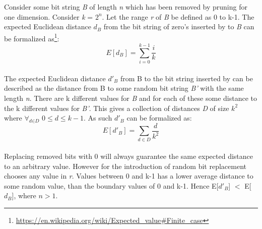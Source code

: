 Consider some bit string \textit{B} of length \textit{n} which has been removed by \qs{} pruning for one dimension. Consider \textit{k} = $2^n$. Let the range \textit{r} of \textit{B} be defined as 0 to k-1. The expected Euclidean distance \textit{$d_B$} from the bit string of zero's inserted by \qs{} to \textit{B} can be formalized as\footnote{\url{https://en.wikipedia.org/wiki/Expected_value\#Finite_case}}:
\\
$$E[\textit{$d_B$}] = \sum_{i=0}^{k - 1} \dfrac{i}{k}$$
\\
The expected Euclidean distance \textit{$d'_B$} from B to the bit string inserted by \qsr{} can be described as the distance from B to some random bit string \textit{B'} with the same length \textit{n}. There are k different values for \textit{B} and for each of these some distance to the k different values for \textit{B'}. This gives a collection of distances \textit{D} of size $k^2$ where $\forall{}_{\textit{d}\in{}\textit{D}}$ $0\leq{}d\leq{}k-1$. As such \textit{$d'_B$} can be formalized as:
\\
$$E[\textit{$d'_B$}] = \sum_{d\in\textit{D}}^{}\dfrac{d}{k^2}$$
\\
Replacing removed bits with 0 will always guarantee the same expected distance to an arbitrary value. However for \qsr{} the introduction of random bit replacement chooses any value in \textit{r}. Values between 0 and k-1 has a lower average distance to some random value, than the boundary values of 0 and k-1. Hence E[\textit{$d'_B$}] $<$ E[\textit{$d_B$}], where $n>1$.
